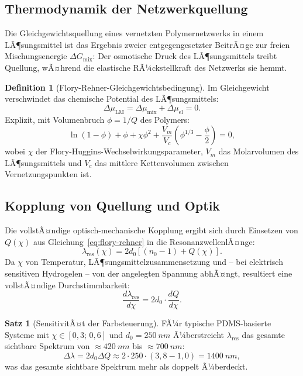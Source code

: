 ﻿\documentclass[a4paper,12pt]{scrreprt}
\theoremstyle{definition}
\newtheorem{definition}{Definition}[section]
\newtheorem{satz}{Satz}[section]
\begin{document}
\subsection{Thermodynamik der Netzwerkquellung}

Die Gleichgewichtsquellung eines vernetzten Polymernetzwerks in einem
LÃ¶sungsmittel ist das Ergebnis zweier entgegengesetzter BeitrÃ¤ge zur freien
Mischungsenergie $\Delta G_{\mathrm{mix}}$: Der osmotische Druck des LÃ¶sungsmittels
treibt Quellung, wÃ¤hrend die elastische RÃ¼ckstellkraft des Netzwerks sie hemmt.

\begin{definition}[Flory-Rehner-Gleichgewichtsbedingung]
  Im Gleichgewicht verschwindet das chemische Potential des LÃ¶sungsmittels:
  \begin{equation}
    \Delta\mu_{\mathrm{LM}} = \Delta\mu_{\mathrm{mix}} + \Delta\mu_{\mathrm{el}} = 0.
  \end{equation}
  Explizit, mit Volumenbruch $\phi = 1/Q$ des Polymers:
  \begin{equation}
    \ln(1-\phi) + \phi + \chi\phi^2 + \frac{V_m}{V_c}\left(\phi^{1/3} - \frac{\phi}{2}\right) = 0,
    \label{eq:flory-rehner}
  \end{equation}
  wobei $\chi$ der Flory-Huggins-Wechselwirkungsparameter, $V_m$ das
  Molarvolumen des LÃ¶sungsmittels und $V_c$ das mittlere Kettenvolumen zwischen
  Vernetzungspunkten ist.
\end{definition}

\subsection{Kopplung von Quellung und Optik}

Die vollstÃ¤ndige optisch-mechanische Kopplung ergibt sich durch Einsetzen
von $Q(\chi)$ aus Gleichung~\eqref{eq:flory-rehner} in die ResonanzwellenlÃ¤nge:
\begin{equation}
  \lambda_\mathrm{res}(\chi) = 2 d_0 \left[(n_0 - 1) + Q(\chi)\right].
\end{equation}
Da $\chi$ von Temperatur, LÃ¶sungsmittelzusammensetzung und -- bei elektrisch
sensitiven Hydrogelen -- von der angelegten Spannung abhÃ¤ngt, resultiert eine
vollstÃ¤ndige Durchstimmbarkeit:
\begin{equation}
  \frac{d\lambda_\mathrm{res}}{d\chi} = 2d_0 \cdot \frac{dQ}{d\chi}.
\end{equation}

\begin{satz}[SensitivitÃ¤t der Farbsteuerung]
  FÃ¼r typische PDMS-basierte Systeme mit $\chi \in [0{,}3;\, 0{,}6]$ und
  $d_0 = \SI{250}{nm}$ Ã¼berstreicht $\lambda_\mathrm{res}$ das gesamte
  sichtbare Spektrum von $\approx \SI{420}{nm}$ bis $\approx \SI{700}{nm}$:
  \begin{equation}
    \Delta\lambda = 2d_0 \Delta Q \approx 2 \cdot 250 \cdot (3{,}8 - 1{,}0)
    = \SI{1400}{nm},
  \end{equation}
  was das gesamte sichtbare Spektrum mehr als doppelt Ã¼berdeckt.
\end{satz}
\end{document}
